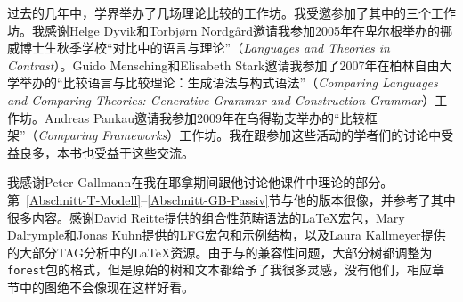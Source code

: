 过去的几年中，学界举办了几场理论比较的工作坊。我受邀参加了其中的三个工作坊。我感谢Helge Dyvik和Torbjørn Nordgård邀请我参加2005年在卑尔根举办的挪威博士生秋季学校“对比中的语言与理论”（\emph{Languages and Theories in Contrast}）。Guido Mensching和Elisabeth
Stark邀请我参加了2007年在柏林自由大学举办的“比较语言与比较理论：生成语法与构式语法”（\emph{Comparing Languages and Comparing Theories:
  Generative Grammar and Construction Grammar}）工作坊。Andreas Pankau邀请我参加2009年在乌得勒支举办的“比较框架”（\emph{Comparing
  Frameworks}）工作坊。我在跟参加这些活动的学者们的讨论中受益良多，本书也受益于这些交流。

我感谢Peter Gallmann在我在耶拿期间跟他讨论他课件中\gb 理论的部分。第~\ref{Abschnitt-T-Modell}--\ref{Abschnitt-GB-Passiv}节与他的版本很像，并参考了其中很多内容。感谢David Reitte提供的组合性范畴语法的\LaTeX{}宏包，Mary Dalrymple和Jonas Kuhn提供的LFG宏包和示例结构，以及Laura Kallmeyer提供的大部分TAG分析中的\LaTeX{}资源。由于与\XeLaTeX 的兼容性问题，大部分树都调整为\texttt{forest}包的格式，但是原始的树和文本都给予了我很多灵感，没有他们，相应章节中的图绝不会像现在这样好看。

